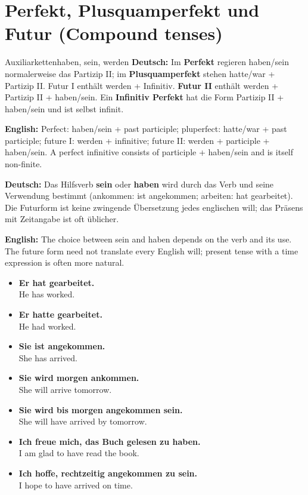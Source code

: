 \documentclass[a4paper,11pt]{article}
\newcommand{\GermanText}[1]{\textbf{Deutsch: }#1\par}
\newcommand{\EnglishText}[1]{{\small\color{SoftGray}\textbf{English: }#1\par}}
\newcommand{\ExampleItem}[2]{\item \textbf{#1}\\{\small\color{SoftGray}#2}}
\newcommand{\DEEN}[2]{\GermanText{#1}\EnglishText{#2}}
\newcommand{\Pair}[2]{\ExampleItem{#1}{#2}}
\begin{document}
\section{Perfekt, Plusquamperfekt und Futur \textnormal{(Compound tenses)}}
\begin{grammarentry}{Auxiliarketten}{haben, sein, werden}
\DEEN{Im \textbf{Perfekt} regieren haben/sein normalerweise das Partizip II; im \textbf{Plusquamperfekt} stehen hatte/war + Partizip II. Futur I enthält werden + Infinitiv. \textbf{Futur II} enthält werden + Partizip II + haben/sein. Ein \textbf{Infinitiv Perfekt} hat die Form Partizip II + haben/sein und ist selbst infinit.}{Perfect: haben/sein + past participle; pluperfect: hatte/war + past participle; future I: werden + infinitive; future II: werden + participle + haben/sein. A perfect infinitive consists of participle + haben/sein and is itself non-finite.}
\DEEN{Das Hilfsverb \textbf{sein} oder \textbf{haben} wird durch das Verb und seine Verwendung bestimmt (ankommen: ist angekommen; arbeiten: hat gearbeitet). Die Futurform ist keine zwingende Übersetzung jedes englischen will; das Präsens mit Zeitangabe ist oft üblicher.}{The choice between sein and haben depends on the verb and its use. The future form need not translate every English will; present tense with a time expression is often more natural.}
\end{grammarentry}
\begin{exbox}\begin{itemize}
\Pair{Er hat gearbeitet.}{He has worked.}
\Pair{Er hatte gearbeitet.}{He had worked.}
\Pair{Sie ist angekommen.}{She has arrived.}
\Pair{Sie wird morgen ankommen.}{She will arrive tomorrow.}
\Pair{Sie wird bis morgen angekommen sein.}{She will have arrived by tomorrow.}
\Pair{Ich freue mich, das Buch gelesen zu haben.}{I am glad to have read the book.}
\Pair{Ich hoffe, rechtzeitig angekommen zu sein.}{I hope to have arrived on time.}
\end{itemize}\end{exbox}
\end{document}
